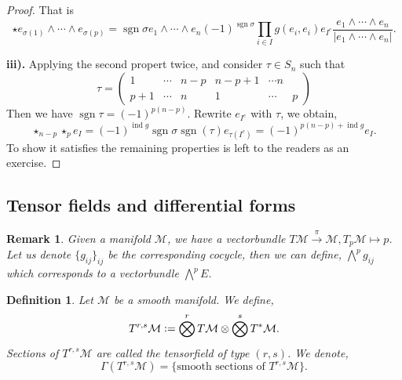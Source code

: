 \documentclass[10pt]{article}
\newtheorem{definition}{Definition}[section]
\newtheorem{remark}{Remark}[section]
\DeclareMathOperator{\ind}{ind}
\DeclareMathOperator{\sgn}{sgn}
\newcommand{\defeq}{\vcentcolon=}
\newcommand{\M}[0]{\mathcal{M}}
\begin{document}
\begin{proof}
That is 
\begin{equation*}
  \star e_{\sigma(1)}\wedge\cdots\wedge e_{\sigma(p)}={\sgn\sigma}e_1\wedge\cdots\wedge e_n(-1)^{\sgn\sigma}\prod_{i\in I}g(e_i,e_i)e_{I^c}{\frac {e_1\wedge\cdots\wedge e_n} {\vert e_1\wedge\cdots\wedge e_n\vert}}.
\end{equation*}
\par\textbf{iii).}
Applying the second propert twice, and consider $\tau\in S_n$ such that 
\begin{equation*}
  \tau = \begin{pmatrix}
    1 & \cdots & n-p & n-p+1 & \cdots n \\ 
    p+1 & \cdots & n & 1 & \cdots & p
  \end{pmatrix}
\end{equation*}
Then we have $\sgn\tau = (-1)^{p(n-p)}$. Rewrite $e_{I^c}$ with $\tau$, we obtain,
\begin{equation*}
  \star_{n-p}\star_{p}e_I = (-1)^{\ind g} \sgn\sigma\sgn(\tau)e_{\tau(I^c)} = (-1)^{p(n-p)+\ind g}e_I.
\end{equation*}
To show it satisfies the remaining properties is left to the readers as an exercise.
\end{proof}


\subsection{Tensor fields and differential forms}

\begin{remark}
  Given a manifold $\M$, we have a vectorbundle $T\M\stackrel{\pi}{\to}\M, T_p\M\mapsto p$. Let us denote $\{g_{ij}\}_{ij}$ be the corresponding cocycle, 
  then we can define, $\bigwedge^p g_{ij}$ which corresponds to a vectorbundle $\bigwedge^pE$. 
\end{remark}

\begin{definition}
  Let $\M$ be a smooth manifold. We define,
  \begin{equation*}
    T^{r,s}\M\defeq\bigotimes^rT\M\otimes\bigotimes^sT^*\M.
  \end{equation*}
  Sections of $T^{r,s}\M$ are called the tensorfield of type $(r,s)$. We denote,
  \begin{equation*}
    \Gamma(T^{r,s}\M) = \{\text{smooth sections of $T^{r,s}\M$}\}.
  \end{equation*}
\end{definition}
\end{document}
